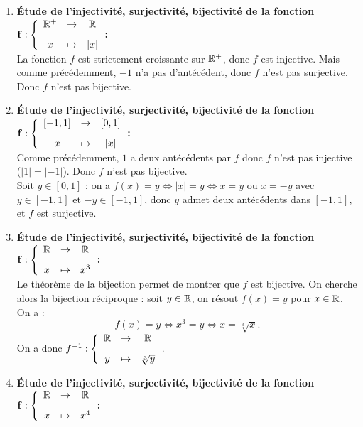 \documentclass[a4paper, 11pt,reqno]{article}
\begin{document}
\begin{correction}
\begin{enumerate}
		\item  \textbf{\'Etude de l'injectivit\'e, surjectivit\'e, bijectivit\'e de la fonction $\mathbf{f:\left\lbrace\begin{array}{ccc} \R^+&\rightarrow& \R\vsec\\ x & \mapsto & |x|\end{array}\right.}$:}\\
		      La fonction $f$ est strictement croissante sur $\mathbb{R}^+$, donc $f$ est injective.
		      Mais comme pr\'ec\'edemment, $-1$ n'a pas d'ant\'ec\'edent, donc $f$ n'est pas surjective. Donc $f$ n'est pas bijective.
		\item  \textbf{\'Etude de l'injectivit\'e, surjectivit\'e, bijectivit\'e de la fonction $\mathbf{f:\left\lbrace\begin{array}{ccc} \lbrack -1,1\rbrack &\rightarrow& \lbrack 0,1\rbrack\vsec\\ x & \mapsto & |x|\end{array}\right.}$:}\\
		      Comme pr\'ec\'edemment, $1$ a deux ant\'ec\'edents par $f$ donc $f$ n'est pas injective ($|1|=|-1|$). Donc $f$ n'est pas bijective.\\
		      Soit $y \in [0,1]$ : on a $f(x)=y \Leftrightarrow |x|=y \Leftrightarrow x = y$ ou $x=-y$ avec $y \in [-1,1]$ et $-y\in [-1,1]$, donc $y$ admet deux ant\'ec\'edents dans $[-1,1]$, et $f$ est surjective.
		\item  \textbf{\'Etude de l'injectivit\'e, surjectivit\'e, bijectivit\'e de la fonction $\mathbf{f:\left\lbrace\begin{array}{ccc} \R&\rightarrow& \R\vsec\\ x & \mapsto & x^3\end{array}\right.}$:}\\
		      Le th\'eor\`eme de la bijection permet de montrer que $f$ est bijective. On cherche alors la bijection r\'eciproque : soit $y \in \mathbb{R}$, on r\'esout $f(x)=y$ pour $x \in \mathbb{R}$. On a :
		      $$f(x) = y \Leftrightarrow x^3= y \Leftrightarrow x=\sqrt[3]{x}.$$
		      On a donc $f^{-1} : \left\lbrace\begin{array}{ccc} \R&\rightarrow& \R\vsec\\ y & \mapsto & \sqrt[3]{y} \end{array}\right.$.
		\item  \textbf{\'Etude de l'injectivit\'e, surjectivit\'e, bijectivit\'e de la fonction $\mathbf{f:\left\lbrace\begin{array}{ccc} \R&\rightarrow& \R\vsec\\ x & \mapsto & x^4\end{array}\right.}$:}\\

\end{enumerate}
\end{correction}
\end{document}
